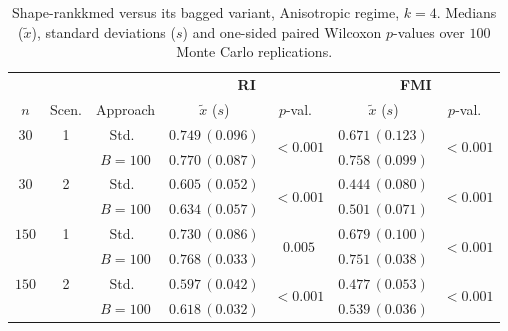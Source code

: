 \begin{table}[h]
\centering
\caption{Shape-rankkmed versus its bagged variant, Anisotropic regime, $k=4$. Medians ($\tilde x$), standard deviations ($s$) and one-sided paired Wilcoxon $p$-values over $100$ Monte Carlo replications.}
\label{tab:rkm-aniso-k4}
\footnotesize
\begin{tabular}{cc c cc cc}
\toprule
& & & \multicolumn{2}{c}{\textbf{RI}} & \multicolumn{2}{c}{\textbf{FMI}} \\
\cmidrule(lr){4-5}\cmidrule(lr){6-7}
$n$ & Scen. & Approach & $\tilde x$ ($s$) & $p$-val.\ & $\tilde x$ ($s$) & $p$-val.\ \\
\midrule
$30$ & 1 & Std.\ & $0.749\,(0.096)$ & \multirow{2}{*}{$\mathbf{<\!0.001}$} & $0.671\,(0.123)$ & \multirow{2}{*}{$\mathbf{<\!0.001}$} \\
     &   & $B{=}100$ & $0.770\,(0.087)$ & & $0.758\,(0.099)$ & \\
$30$ & 2 & Std.\ & $0.605\,(0.052)$ & \multirow{2}{*}{$\mathbf{<\!0.001}$} & $0.444\,(0.080)$ & \multirow{2}{*}{$\mathbf{<\!0.001}$} \\
     &   & $B{=}100$ & $0.634\,(0.057)$ & & $0.501\,(0.071)$ & \\
$150$ & 1 & Std.\ & $0.730\,(0.086)$ & \multirow{2}{*}{$\mathbf{0.005}$} & $0.679\,(0.100)$ & \multirow{2}{*}{$\mathbf{<\!0.001}$} \\
     &   & $B{=}100$ & $0.768\,(0.033)$ & & $0.751\,(0.038)$ & \\
$150$ & 2 & Std.\ & $0.597\,(0.042)$ & \multirow{2}{*}{$\mathbf{<\!0.001}$} & $0.477\,(0.053)$ & \multirow{2}{*}{$\mathbf{<\!0.001}$} \\
     &   & $B{=}100$ & $0.618\,(0.032)$ & & $0.539\,(0.036)$ & \\
\bottomrule
\end{tabular}
\end{table}

